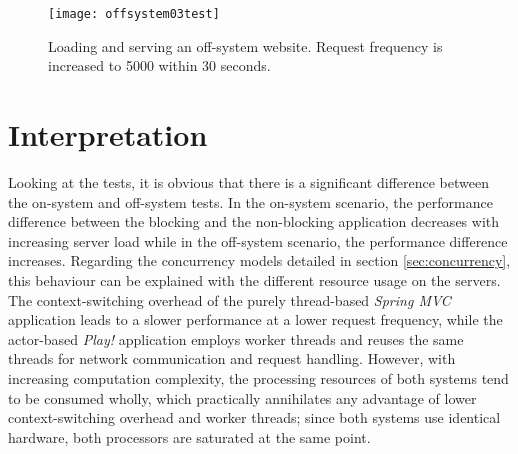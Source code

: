 \begin{figure}
\centering\small
\setlength{\tabcolsep}{0mm}
  \texttt{[image: offsystem03test]}
\caption{Loading and serving an off-system website. Request frequency is increased to 5000 within 30 seconds.
}
\label{fig:test7} 
\end{figure}

\section{Interpretation}
Looking at the tests, it is obvious that there is a significant difference between the on-system and off-system tests. In the on-system scenario, the performance difference between the blocking and the non-blocking application decreases with increasing server load while in the off-system scenario, the performance difference increases. Regarding the concurrency models detailed in section \ref{sec:concurrency}, this behaviour can be explained with the different resource usage on the servers. The context-switching overhead of the purely thread-based \textit{Spring MVC} application leads to a slower performance at a lower request frequency, while the actor-based \textit{Play!} application employs worker threads and reuses the same threads for network communication and request handling. However, with increasing computation complexity, the processing resources of both systems tend to be consumed wholly, which practically annihilates any advantage of lower context-switching overhead and worker threads; since both systems use identical hardware, both processors are saturated at the same point.

